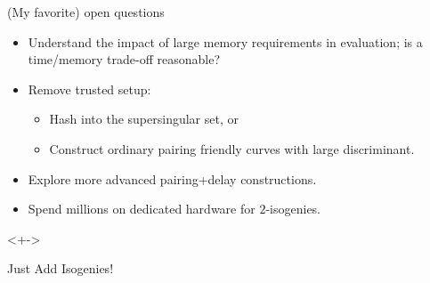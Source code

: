 \documentclass[aspectratio=169]{beamer}
\begin{document}
\begin{frame}{(My favorite) open questions}
  \begin{itemize}
  \item<+-> Understand the impact of large memory requirements in
    evaluation; is a time/memory trade-off reasonable?
  \item<+-> Remove trusted setup:
    \begin{itemize}
    \item Hash into the supersingular set, or
    \item Construct ordinary pairing friendly curves with large
      discriminant.
    \end{itemize}
  \item<+-> Explore more advanced pairing+delay constructions.
  \item<+-> Spend millions on dedicated hardware for $2$-isogenies.
  \end{itemize}

  \bigskip
  \begin{uncoverenv}<+->
    \begin{center}
      \Large Just Add Isogenies\texttrademark!
    \end{center}
  \end{uncoverenv}
\end{frame}


\begin{frame}[plain]
  \centering
\end{frame}
\end{document}
